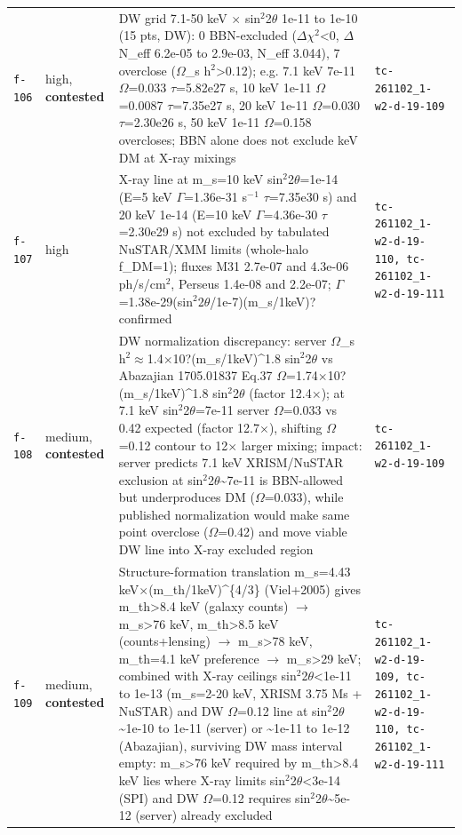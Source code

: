 \documentclass[11pt,a4paper]{article}
\begin{document}
\begin{longtable}{@{}p{}p{}p{}p{}@{}}
\texttt{f-106} & high, \textbf{contested} & DW grid 7.1-50 keV $\times$ sin$^2$2$\theta$ 1e-11 to 1e-10 (15 pts, DW): 0 BBN-excluded ($\Delta$$\chi$$^2$\textless{}0, $\Delta$N\_eff 6.2e-05 to 2.9e-03, N\_eff 3.044), 7 overclose ($\Omega$\_s h$^2$\textgreater{}0.12); e.g. 7.1 keV 7e-11 $\Omega$=0.033 $\tau$=5.82e27 s, 10 keV 1e-11 $\Omega$=0.0087 $\tau$=7.35e27 s, 20 keV 1e-11 $\Omega$=0.030 $\tau$=2.30e26 s, 50 keV 1e-11 $\Omega$=0.158 overcloses; BBN alone does not exclude keV DM at X-ray mixings & \texttt{tc-261102\_\allowbreak{}1-w2-d-19-109} \\
\texttt{f-107} & high & X-ray line at m\_s=10 keV sin$^2$2$\theta$=1e-14 (E=5 keV $\Gamma$=1.36e-31 s$^-$$^1$ $\tau$=7.35e30 s) and 20 keV 1e-14 (E=10 keV $\Gamma$=4.36e-30 $\tau$=2.30e29 s) not excluded by tabulated NuSTAR/XMM limits (whole-halo f\_DM=1); fluxes M31 2.7e-07 and 4.3e-06 ph/s/cm$^2$, Perseus 1.4e-08 and 2.2e-07; $\Gamma$=1.38e-29(sin$^2$2$\theta$/1e-7)(m\_s/1keV)? confirmed & \texttt{tc-261102\_\allowbreak{}1-w2-d-19-110,\allowbreak{} tc-261102\_\allowbreak{}1-w2-d-19-111} \\
\texttt{f-108} & medium, \textbf{contested} & DW normalization discrepancy: server $\Omega$\_s h$^2$$\approx$1.4$\times$10?(m\_s/1keV)\textasciicircum{}1.8 sin$^2$2$\theta$ vs Abazajian 1705.01837 Eq.37 $\Omega$=1.74$\times$10?(m\_s/1keV)\textasciicircum{}1.8 sin$^2$2$\theta$ (factor 12.4$\times$); at 7.1 keV sin$^2$2$\theta$=7e-11 server $\Omega$=0.033 vs 0.42 expected (factor 12.7$\times$), shifting $\Omega$=0.12 contour to 12$\times$ larger mixing; impact: server predicts 7.1 keV XRISM/NuSTAR exclusion at sin$^2$2$\theta$\textasciitilde{}7e-11 is BBN-allowed but underproduces DM ($\Omega$=0.033), while published normalization would make same point overclose ($\Omega$=0.42) and move viable DW line into X-ray excluded region & \texttt{tc-261102\_\allowbreak{}1-w2-d-19-109} \\
\texttt{f-109} & medium, \textbf{contested} & Structure-formation translation m\_s=4.43 keV$\times$(m\_th/1keV)\textasciicircum{}\{4/3\} (Viel+2005) gives m\_th\textgreater{}8.4 keV (galaxy counts) $\to$ m\_s\textgreater{}76 keV, m\_th\textgreater{}8.5 keV (counts+lensing) $\to$ m\_s\textgreater{}78 keV, m\_th=4.1 keV preference $\to$ m\_s\textgreater{}29 keV; combined with X-ray ceilings sin$^2$2$\theta$\textless{}1e-11 to 1e-13 (m\_s=2-20 keV, XRISM 3.75 Ms + NuSTAR) and DW $\Omega$=0.12 line at sin$^2$2$\theta$\textasciitilde{}1e-10 to 1e-11 (server) or \textasciitilde{}1e-11 to 1e-12 (Abazajian), surviving DW mass interval empty: m\_s\textgreater{}76 keV required by m\_th\textgreater{}8.4 keV lies where X-ray limits sin$^2$2$\theta$\textless{}3e-14 (SPI) and DW $\Omega$=0.12 requires sin$^2$2$\theta$\textasciitilde{}5e-12 (server) already excluded & \texttt{tc-261102\_\allowbreak{}1-w2-d-19-109,\allowbreak{} tc-261102\_\allowbreak{}1-w2-d-19-110,\allowbreak{} tc-261102\_\allowbreak{}1-w2-d-19-111} \\

\end{longtable}
\end{document}
